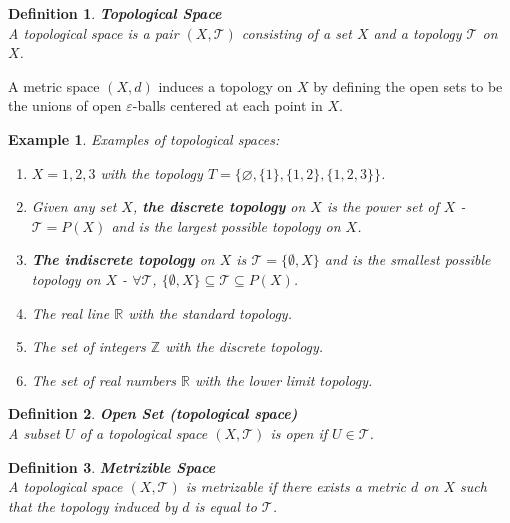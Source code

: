 \documentclass[11pt]{book} %
\newtheorem{definition}{Definition}[section]
\newtheorem*{example*}{Example}
\begin{document}
\begin{definition}{\textbf{Topological Space}} \\
A topological space is a pair \( (X, \mathcal{T}) \) consisting of a set \( X \) and a topology \( \mathcal{T} \) on \( X \).
\end{definition}

A metric space \( (X, d) \) induces a topology on \( X \) by defining the open sets to be the unions of open \( \varepsilon \)-balls centered at each point in \( X \). 

\begin{example*}
Examples of topological spaces:
\begin{enumerate}
    \item \( X = {1, 2, 3} \) with the topology \( T = \{\varnothing , \{1\}, \{1, 2\}, \{1, 2, 3\} \} \).
    \item Given any set $X$, \textbf{the discrete topology} on $X$ is the power set of $X$ - $\mathcal{T} = P(X)$ and is the largest possible topology on $X$.
    \item \textbf{The indiscrete topology} on $X$ is $\mathcal{T} = \{\emptyset, X\}$ and is the smallest possible topology on $X$ - 
    $\forall \mathcal{T}$, $\{\emptyset, X\} \subseteq \mathcal{T} \subseteq P(X)$.
    \item The real line \( \mathbb{R} \) with the standard topology.
    \item The set of integers \( \mathbb{Z} \) with the discrete topology.
    \item The set of real numbers \( \mathbb{R} \) with the lower limit topology.
\end{enumerate}
\end{example*}

\begin{definition}{\textbf{Open Set (topological space)}} \\
    A subset \( U \) of a topological space \( (X, \mathcal{T}) \) is open if \( U \in \mathcal{T} \).
\end{definition}

\begin{definition}{\textbf{Metrizible Space}} \\
    A topological space \( (X, \mathcal{T}) \) is metrizable if there exists a metric \( d \) on \( X \) such that 
    the topology induced by \( d \) is equal to \( \mathcal{T} \).
\end{definition}

\end{document}
